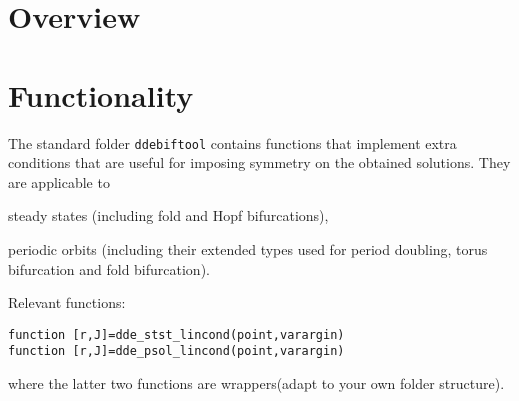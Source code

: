 \documentclass[11pt]{scrartcl}
\begin{document}
\maketitle
\noindent 
\section{Overview}
\label{sec:quick}


\section{Functionality}
\label{sec:extra}

The standard folder \texttt{ddebiftool} contains functions that
implement extra conditions that are useful for imposing symmetry on the obtained solutions. They are applicable to
\begin{compactitem}
\item steady states (including fold and Hopf bifurcations),
\item periodic orbits (including their extended types used for period
  doubling, torus bifurcation and fold bifurcation).
\end{compactitem}
Relevant functions:
\begin{lstlisting}
function [r,J]=dde_stst_lincond(point,varargin)
function [r,J]=dde_psol_lincond(point,varargin)
\end{lstlisting}
where the latter two functions are wrappers(adapt to your own folder structure).
\end{document}
